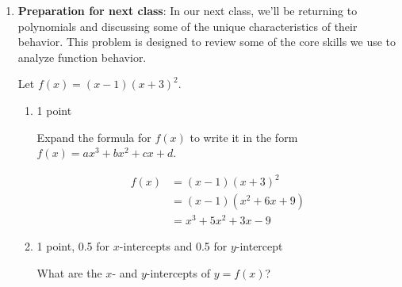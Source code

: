 \documentclass{article}
\begin{document}
\begin{enumerate}
\begin{enumerate}
    \begin{problem}[\nstretch{0.5}]
      Whose account as a higher annual percent increase? How do you know? 
    \end{problem}

    \begin{solution}
      Since Charlotte started with less money but eventually catches up, she must have the higher annual percent increase. 
    \end{solution}

  \end{enumerate}
  
\item 
\label{graph-cubic-with-repeated-root}

  {\bf Preparation for next class}: In our next class, we'll be returning to polynomials and discussing some of the unique characteristics of their behavior. This problem is designed to review some of the core skills we use to analyze function behavior.

  Let $f(x) = (x - 1) (x + 3)^2$.

  \begin{enumerate}
  \item

    \begin{grading}
      1 point
    \end{grading}

    \begin{problem}[\vfill]
      Expand the formula for $f(x)$ to write it in the form $f(x) = ax^3 + bx^2 + cx + d$.
    \end{problem}

    \begin{solution}
      \begin{align*}
        f(x) &= (x-1)(x+3)^2 \\
        &= (x-1)(x^2 + 6x + 9) \\
        &= x^3 + 5x^2 + 3x - 9
      \end{align*}
    \end{solution}

  \item \label{graph-cubic-with-repeated-root-intercepts}

    \begin{grading}
      1 point, 0.5 for $x$-intercepts and 0.5 for $y$-intercept
    \end{grading}

    \begin{problem}[\vfill]
      What are the $x$- and $y$-intercepts of $y = f(x)$? 
    \end{problem}


\end{enumerate}
\end{enumerate}
\end{document}

